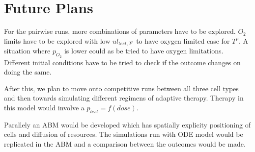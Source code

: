 \documentclass[11pt,a4paper]{article}
\begin{document}
\section{Future Plans}
For the pairwise runs, more combinations of parameters have to be explored. $O_2$ limits have to be explored with low $ul_{test,T^p}$ to have oxygen limited case for $T^p$. A situation where $p_{O_2}$ is lower could as be tried to have oxygen limitations. Different initial conditions have to be tried to check if the outcome changes on doing the same.

After this, we plan to move onto competitive runs between all three cell types and then towards simulating different regimens of adaptive therapy. Therapy in this model would involve a $p_{test} = f(dose)$.

Parallely an ABM would be developed which has spatially explicity positioning of cells and diffusion of resources. The simulations run with ODE model would be replicated in the ABM and a comparison between the outcomes would be made.

\printbibliography
\end{document}
